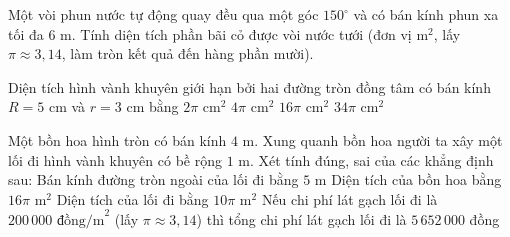 \begin{bt}%
	Một vòi phun nước tự động quay đều qua một góc $150^\circ$ và có bán kính phun xa tối đa $6\text{ m}$. Tính diện tích phần bãi cỏ được vòi nước tưới (đơn vị $\text{m}^2$, lấy $\pi \approx 3{,}14$, làm tròn kết quả đến hàng phần mười).
\end{bt}


\begin{ex}%
	Diện tích hình vành khuyên giới hạn bởi hai đường tròn đồng tâm có bán kính $R = 5\text{ cm}$ và $r = 3\text{ cm}$ bằng
	\choice
	{$2\pi\text{ cm}^2$}
	{$4\pi\text{ cm}^2$}
	{\True $16\pi\text{ cm}^2$}
	{$34\pi\text{ cm}^2$}
\end{ex}

\begin{ex}%
	Một bồn hoa hình tròn có bán kính $4\text{ m}$. Xung quanh bồn hoa người ta xây một lối đi hình vành khuyên có bề rộng $1\text{ m}$. Xét tính đúng, sai của các khẳng định sau:
	\choiceTF
	{\True Bán kính đường tròn ngoài của lối đi bằng $5\text{ m}$}
	{\True Diện tích của bồn hoa bằng $16\pi\text{ m}^2$}
	{Diện tích của lối đi bằng $10\pi\text{ m}^2$}
	{\True Nếu chi phí lát gạch lối đi là $200\,000\text{ đồng/m}^2$ (lấy $\pi \approx 3{,}14$) thì tổng chi phí lát gạch lối đi là $5\,652\,000$ đồng}
\end{ex}

